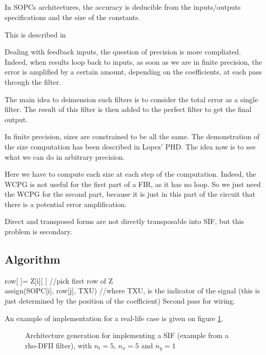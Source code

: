 \subsection{}

In SOPCs architectures, the accuracy is deducible from the inputs/outputs specifications and the size of the constants.

This is described in %

Dealing with feedback inputs, the question of precision is more compliated.
Indeed, when results loop back to inputs, as soon as we are in finite precision, the error is amplified by a certain amount, depending on the coefficients, at each pass through the filter.

The main idea to deimension such filters is to consider the total error as a single filter.
The result of this filter is then added to the perfect filter to get the final output.

In finite precision, sizes are constrained to be all the same. The demonstration of the size computation has been described in Lopez' PHD.
The idea now is to see what we can do in arbitrary precision.

Here we have to compute each size at each step of the computation. Indeed, the WCPG is not useful for the first part of a FIR, as it has no loop.
So we just need the WCPG for the second part, because it is just in this part of the circuit that there is a potential error amplification.

Direct and transposed forms are not directly transposable into SIF, but this problem is secondary.

\subsection{Algorithm}

	\begin{algorithm}[H]
	 {
	 	row[ ]= Z[i][ ] //pick first row of Z \\
	 	 {
	 		assign(SOPC[i], row[j], TXU) //where TXU, is the indicator of the signal (this is just determined by the position of the coefficient)
	 	}
		Second pass for wiring.
	}
	\end{algorithm}

	An example of implementation for a real-life case is given on figure \ref{fig:SIFimpl}.

	\begin{figure}[!h]
	\begin{center}
	\scalebox{7}{}
	\end{center}
	\caption{ Architecture generation for implementing a SIF (example from a rho-DFII filter), with $n_t=5$, $n_x=5$ and $n_y=1$ \label{fig:SIFimpl}}
	\end{figure}

